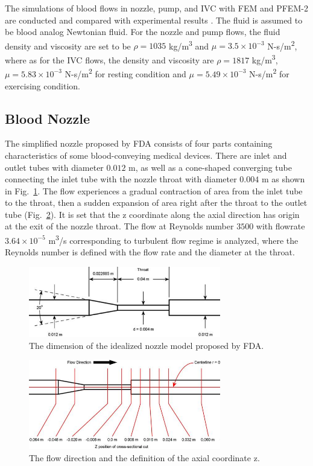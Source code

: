 The simulations of blood flows in nozzle, pump, and IVC with FEM and PFEM-2 are conducted and compared with experimental results \cite{fda_res,fda_nozzle ,fda_pump,gallagher_exp}. The fluid is assumed to be blood analog Newtonian fluid. For the nozzle and pump flows, the fluid density and viscosity are set to be $\rho= 1035$ kg/m\textsuperscript{3} and $\mu =3.5\times10^{-3}$ N-s/m\textsuperscript{2}, where as for the IVC flows, the density and viscosity are $\rho=1817$ kg/m\textsuperscript{3}, $\mu=5.83\times10^{-3}$ N-s/m\textsuperscript{2} for resting condition and $\mu=5.49\times10^{-3}$ N-s/m\textsuperscript{2} for exercising condition. 

\subsection{Blood Nozzle}

The simplified nozzle proposed by FDA consists of four parts containing characteristics of some blood-conveying medical devices. There are inlet and outlet tubes with diameter $0.012$ m, as well as a cone-shaped converging tube connecting the inlet tube with the nozzle throat with diameter $0.004$ m as shown in Fig.~\ref{fig:nozzlegeo1}. The flow experiences a gradual contraction of area from the inlet tube to the throat, then a sudden expansion of area right after the throat to the outlet tube (Fig.~\ref{fig:nozzlegeo2}). It is set that the z coordinate along the axial direction has origin at the exit of the nozzle throat. The flow at Reynolds number $3500$ with flowrate $3.64\times10^{-5}$ m\textsuperscript{3}/s corresponding to turbulent flow regime is analyzed, where the Reynolds number is defined with the flow rate and the diameter at the throat. 

\begin{figure}[htbp]
    \centering
    \includegraphics[width=3.3in]{imgs/nozzle_pump/nozzle_geo_2.png}
    \caption{The dimension of the idealized nozzle model proposed by FDA.}
    \label{fig:nozzlegeo1}
\end{figure}
\begin{figure}[htbp]
    \centering
    \includegraphics[width=3.3in]{imgs/nozzle_pump/nozzle_CS_2.png}
    \caption{The flow direction and the definition of the axial coordinate z.}
    \label{fig:nozzlegeo2}
\end{figure}



